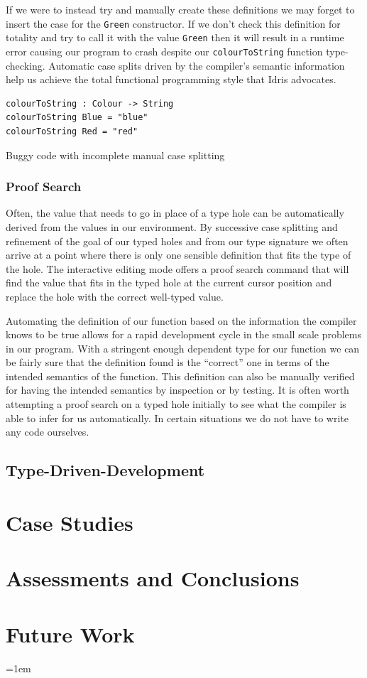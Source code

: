 \documentclass[a4paper, notitlepage]{report}
\begin{document}
If we were to instead try and manually create these definitions we may forget to
insert the case for the \texttt{Green} constructor. If we don't check this definition for
totality and try to call it with the value \texttt{Green} then it will result in a
runtime error causing our program to crash despite our \texttt{colourToString} function
type-checking. Automatic case splits driven by the compiler's semantic
information help us achieve the total functional programming style that Idris
advocates.

\begin{listing}[H]
\begin{verbatim}
colourToString : Colour -> String
colourToString Blue = "blue"
colourToString Red = "red"
\end{verbatim}
\caption{Buggy code with incomplete manual case splitting}
\end{listing}

\subsection{Proof Search}
\label{sec:orgc613761}
Often, the value that needs to go in place of a type hole can be automatically
derived from the values in our environment. By successive case splitting and
refinement of the goal of our typed holes and from our type signature we often
arrive at a point where there is only one sensible definition that fits the type
of the hole. The interactive editing mode offers a proof search command that
will find the value that fits in the typed hole at the current cursor position
and replace the hole with the correct well-typed value.

Automating the definition of our function based on the information the compiler
knows to be true allows for a rapid development cycle in the small scale
problems in our program. With a stringent enough dependent type for our function
we can be fairly sure that the definition found is the ``correct'' one in terms
of the intended semantics of the function. This definition can also be manually
verified for having the intended semantics by inspection or by testing. It is
often worth attempting a proof search on a typed hole initially to see what the
compiler is able to infer for us automatically. In certain situations we do not
have to write any code ourselves.

\section{Type-Driven-Development}
\label{sec:org8c954c9}
\chapter{Case Studies}
\label{sec:orgfe8bce0}
\chapter{Assessments and Conclusions}
\label{sec:org623fcf7}
\chapter{Future Work}
\label{sec:orgc01e550}

\emergencystretch=1em
\printbibliography[heading=bibintoc, title=References]
\appendix
\end{document}
